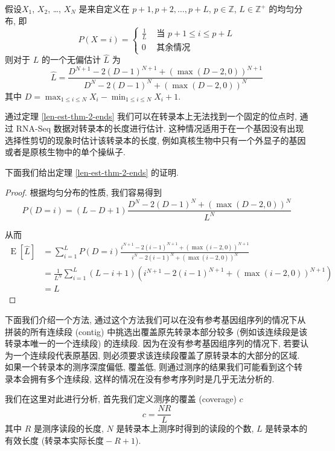 \begin{thm}
\label{len-est-thm-2-ends}
假设$X_1$, $X_2$, \ldots, $X_N$ 是来自定义在 
${p+1, p+2, \ldots , p+L}$, $p \in \mathbb{Z}$, $L \in \mathbb{Z}^+$ 的均匀分布, 
即 
\[
P(X = i) =  \begin{cases}
\frac{1}{L} & \text{ 当 } p+1 \leq i \leq p+L \\
0 & \text{ 其余情况 }
\end{cases}
\]
则对于 $L$ 的一个无偏估计 $\hat{L}$ 为
\begin{equation}
\label{len-est-thm-2-ends-eq}
\hat{L} = \frac{ D^{N+1} - 2 (D-1)^{N+1} + (\max(D-2, 0))^{N+1} }{ D^{N} - 2 (D-1)^{N} + (\max(D-2, 0))^{N} }
\end{equation}
其中 $D = \max_{1 \leq i \leq N} X_i - \min_{1 \leq i \leq N} X_i +1$. 
\end{thm}

通过定理 \ref{len-est-thm-2-ends} 我们可以在转录本上无法找到一个固定的位点时, 
通过 RNA-Seq 数据对转录本的长度进行估计. 
这种情况适用于在一个基因没有出现选择性剪切的现象时估计该转录本的长度, 
例如真核生物中只有一个外显子的基因或者是原核生物中的单个操纵子. 

下面我们给出定理 \ref{len-est-thm-2-ends} 的证明. 

\begin{proof}
根据均匀分布的性质, 我们容易得到
\[
P(D=i) = (L-D +1) \frac{ D^N - 2 (D-1)^N  + (\max(D-2,0))^N}{ L^N }
\]

从而
\begin{align*}
\operatorname{E}[\hat{L}] &= \sum_{i=1}^L P(D=i) 
    \frac{i^{N+1}-2(i-1)^{N+1}+(\max(i-2,0))^{N+1}}{i^N-2(i-1)^N+(\max(i-2,0))^N} \\
&= \frac{1}{L^N} \sum_{i=1}^L (L-i+1)(i^{N+1}-2(i-1)^{N+1}+(\max(i-2,0))^{N+1}) \\
&= L
\end{align*}
\end{proof}

下面我们介绍一个方法, 
通过这个方法我们可以在没有参考基因组序列的情况下从拼装的所有连续段 (contig) 
中挑选出覆盖原先转录本部分较多 (例如该连续段是该转录本唯一的一个连续段) 的连续段. 
因为在没有参考基因组序列的情况下, 若要认为一个连续段代表原基因, 
则必须要求该连续段覆盖了原转录本的大部分的区域. 
如果一个转录本的测序深度偏低, 覆盖低, 
则通过测序的结果我们可能看到这个转录本会拥有多个连续段, 
这样的情况在没有参考序列时是几乎无法分析的. 

我们在这里对此进行分析, 首先我们定义测序的覆盖 (coverage) $c$
\begin{equation}
c = \frac{NR}{L}
\end{equation}
其中 $R$ 是测序读段的长度, $N$ 是转录本上测序时得到的读段的个数, 
$L$ 是转录本的有效长度 ($\text{转录本实际长度} -R+1$). 

